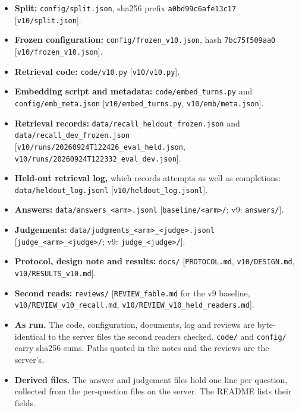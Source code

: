 \documentclass[11pt]{article}
\begin{document}
\begin{itemize}
\item
  \textbf{Split:} \texttt{config/split.json}, sha256 prefix \texttt{a0bd99c6afe13c17} {[}\texttt{v10/split.json}{]}.
\item
  \textbf{Frozen configuration:} \texttt{config/frozen\_v10.json}, hash \texttt{7bc75f509aa0} {[}\texttt{v10/frozen\_v10.json}{]}.
\item
  \textbf{Retrieval code:} \texttt{code/v10.py} {[}\texttt{v10/v10.py}{]}.
\item
  \textbf{Embedding script and metadata:} \texttt{code/embed\_turns.py} and \texttt{config/emb\_meta.json}
  {[}\texttt{v10/embed\_turns.py}, \texttt{v10/emb/meta.json}{]}.
\item
  \textbf{Retrieval records:} \texttt{data/recall\_heldout\_frozen.json} and \texttt{data/recall\_dev\_frozen.json}
  {[}\texttt{v10/runs/20260924T122426\_eval\_held.json}, \texttt{v10/runs/20260924T122332\_eval\_dev.json}{]}.
\item
  \textbf{Held-out retrieval log,} which records attempts as well as completions: \texttt{data/heldout\_log.jsonl}
  {[}\texttt{v10/heldout\_log.jsonl}{]}.
\item
  \textbf{Answers:} \texttt{data/answers\_\textless{}arm\textgreater{}.jsonl} {[}\texttt{baseline/\textless{}arm\textgreater{}/}; v9: \texttt{answers/}{]}.
\item
  \textbf{Judgements:} \texttt{data/judgments\_\textless{}arm\textgreater{}\_\textless{}judge\textgreater{}.jsonl} {[}\texttt{judge\_\textless{}arm\textgreater{}\_\textless{}judge\textgreater{}/}; v9: \texttt{judge\_\textless{}judge\textgreater{}/}{]}.
\item
  \textbf{Protocol, design note and results:} \texttt{docs/} {[}\texttt{PROTOCOL.md}, \texttt{v10/DESIGN.md}, \texttt{v10/RESULTS\_v10.md}{]}.
\item
  \textbf{Second reads:} \texttt{reviews/} {[}\texttt{REVIEW\_fable.md} for the v9 baseline, \texttt{v10/REVIEW\_v10\_recall.md},
  \texttt{v10/REVIEW\_v10\_held\_readers.md}{]}.
\item
  \textbf{As run.} The code, configuration, documents, log and reviews are byte-identical to the server files the
  second readers checked. \texttt{code/} and \texttt{config/} carry sha256 sums. Paths quoted in the notes and the reviews
  are the server's.
\item
  \textbf{Derived files.} The answer and judgement files hold one line per question, collected from the
  per-question files on the server. The README lists their fields.

\end{itemize}
\end{document}
